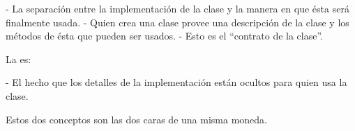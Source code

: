 - La separación entre la implementación de la clase y la manera en que ésta será
finalmente usada.
- Quien crea una clase provee una descripción de la clase y los métodos de ésta que pueden ser usados.
    - Esto es el ``contrato de la clase''.


La  es:

- El hecho que los detalles de la implementación están ocultos para quien usa la clase.

\vfill

Estos dos conceptos son las dos caras de una misma moneda.



\begin{center}





\end{center}
